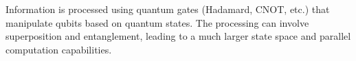 
Information is processed using quantum gates (Hadamard, CNOT, etc.) that manipulate qubits based on quantum states. The processing can involve superposition and entanglement, leading to a much larger state space and parallel computation capabilities.
